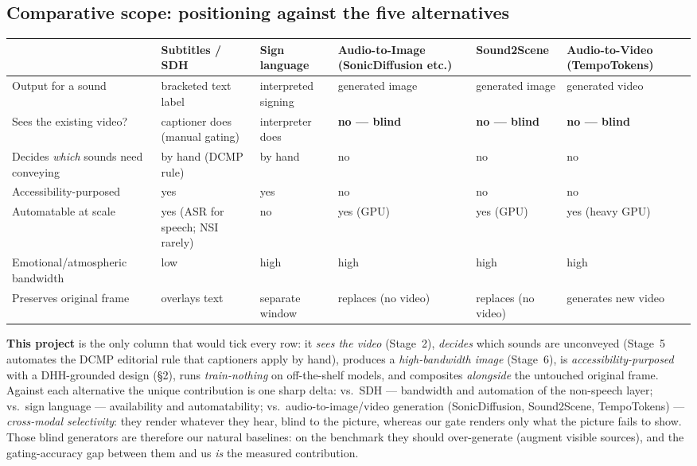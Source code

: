 \documentclass[11pt,a4paper]{article}
\begin{document}
\subsection{Comparative scope: positioning against the five alternatives}
\begin{center}
\small
\begin{longtable}{@{}p{2.6cm}p{2.5cm}p{2.3cm}p{2.2cm}p{2.2cm}p{2.6cm}@{}}
\toprule
& \textbf{Subtitles / SDH} & \textbf{Sign language} & \textbf{Audio-to-Image (SonicDiffusion etc.)} & \textbf{Sound2Scene} & \textbf{Audio-to-Video (TempoTokens)} \\
\midrule
\endhead
Output for a sound & bracketed text label & interpreted signing & generated image & generated image & generated video \\
Sees the existing video? & captioner does (manual gating) & interpreter does & \textbf{no --- blind} & \textbf{no --- blind} & \textbf{no --- blind} \\
Decides \emph{which} sounds need conveying & by hand (DCMP rule) & by hand & no & no & no \\
Accessibility-purposed & yes & yes & no & no & no \\
Automatable at scale & yes (ASR for speech; NSI rarely) & no & yes (GPU) & yes (GPU) & yes (heavy GPU) \\
Emotional/atmospheric bandwidth & low & high & high & high & high \\
Preserves original frame & overlays text & separate window & replaces (no video) & replaces (no video) & generates new video \\
\bottomrule
\end{longtable}
\end{center}

\noindent\textbf{This project} is the only column that would tick every row: it \emph{sees the video}
(Stage~2), \emph{decides} which sounds are unconveyed (Stage~5 automates the DCMP editorial rule that
captioners apply by hand), produces a \emph{high-bandwidth image} (Stage~6), is
\emph{accessibility-purposed} with a DHH-grounded design (\S2), runs \emph{train-nothing} on
off-the-shelf models, and composites \emph{alongside} the untouched original frame. Against each
alternative the unique contribution is one sharp delta: vs.\ SDH --- bandwidth and automation of the
non-speech layer; vs.\ sign language --- availability and automatability; vs.\ audio-to-image/video
generation (SonicDiffusion, Sound2Scene, TempoTokens) --- \emph{cross-modal selectivity}: they render
whatever they hear, blind to the picture, whereas our gate renders only what the picture fails to
show. Those blind generators are therefore our natural baselines: on the benchmark they should
over-generate (augment visible sources), and the gating-accuracy gap between them and us \emph{is}
the measured contribution.
\end{document}
